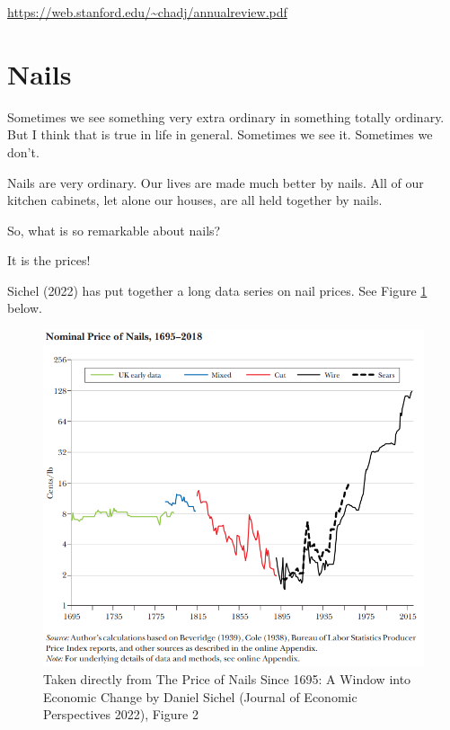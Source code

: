 \documentclass[
]{book}
\begin{document}
\url{https://web.stanford.edu/~chadj/annualreview.pdf}

\hypertarget{nails}{%
\section{Nails}\label{nails}}

Sometimes we see something very extra ordinary in something totally ordinary. But I think that is true in life in general. Sometimes we see it. Sometimes we don't.

Nails are very ordinary. Our lives are made much better by nails. All of our kitchen cabinets, let alone our houses, are all held together by nails.

So, what is so remarkable about nails?

It is the prices!

Sichel (2022) has put together a long data series on nail prices. See Figure \ref{fig:sichelfig2} below.

\begin{figure}

{\centering \includegraphics[width=1\linewidth]{img/growth2/sichelfig2} 

}

\caption{Taken directly from The Price of Nails Since 1695: A Window into Economic Change by Daniel Sichel (Journal of Economic Perspectives 2022), Figure 2 }\label{fig:sichelfig2}
\end{figure}
\end{document}
